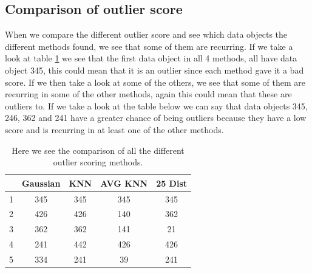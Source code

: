 \subsection{Comparison of outlier score}

When we compare the different outlier score and see which data objects the different methods found, we see that some of them are recurring. If we take a look at table \ref{compare} we see that the first data object in all 4 methods, all have data object 345, this could mean that it is an outlier since each method gave it a bad score. If we then take a look at some of the others, we see that some of them are recurring in some of the other methods, again this could mean that these are outliers to. If we take a look at the table below we can say that data objects 345, 246, 362 and 241 have a greater chance of being outliers because they have a low score and is recurring in at least one of the other methods.
\begin{table}[H]
\begin{longtable}{lcccc}
\hline
  & Gaussian & KNN & AVG KNN & 25 Dist \\ \hline
1 & 345      & 345 & 345     & 345 \\ 
2 & 426      & 426 & 140     & 362 \\ 
3 & 362      & 362 & 141     & 21 \\ 
4 & 241      & 442 & 426     & 426 \\ 
5 & 334      & 241 & 39      & 241 \\ \hline
\end{longtable}
\label{compare}
\caption{\footnotesize Here we see the comparison of all the different outlier scoring methods.}
\end{table}